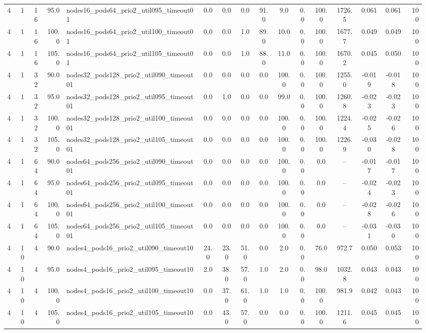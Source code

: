 \begin{tabular}{r r r r l c c c c c c c c c c r}
4 & 1 & 16 & 95.0 & nodes16\_pods64\_prio2\_util095\_timeout01 & 0.0 & 0.0 & 0.0 & 91.0 & 9.0 & 0.0 & 100.0 & 1726.5 & 0.061 & 0.061 & 100 \\
4 & 1 & 16 & 100.0 & nodes16\_pods64\_prio2\_util100\_timeout01 & 0.0 & 0.0 & 1.0 & 89.0 & 10.0 & 0.0 & 100.0 & 1677.7 & 0.049 & 0.049 & 100 \\
4 & 1 & 16 & 105.0 & nodes16\_pods64\_prio2\_util105\_timeout01 & 0.0 & 0.0 & 1.0 & 88.0 & 11.0 & 0.0 & 100.0 & 1670.2 & 0.045 & 0.050 & 100 \\
4 & 1 & 32 & 90.0 & nodes32\_pods128\_prio2\_util090\_timeout01 & 0.0 & 0.0 & 0.0 & 0.0 & 100.0 & 0.0 & 100.0 & 1255.0 & -0.019 & -0.018 & 100 \\
4 & 1 & 32 & 95.0 & nodes32\_pods128\_prio2\_util095\_timeout01 & 0.0 & 1.0 & 0.0 & 0.0 & 99.0 & 0.0 & 100.0 & 1260.8 & -0.023 & -0.023 & 100 \\
4 & 1 & 32 & 100.0 & nodes32\_pods128\_prio2\_util100\_timeout01 & 0.0 & 0.0 & 0.0 & 0.0 & 100.0 & 0.0 & 100.0 & 1224.4 & -0.025 & -0.026 & 100 \\
4 & 1 & 32 & 105.0 & nodes32\_pods128\_prio2\_util105\_timeout01 & 0.0 & 0.0 & 0.0 & 0.0 & 100.0 & 0.0 & 100.0 & 1226.9 & -0.030 & -0.028 & 100 \\
4 & 1 & 64 & 90.0 & nodes64\_pods256\_prio2\_util090\_timeout01 & 0.0 & 0.0 & 0.0 & 0.0 & 100.0 & 0.0 & 0.0 & -- & -0.017 & -0.017 & 100 \\
4 & 1 & 64 & 95.0 & nodes64\_pods256\_prio2\_util095\_timeout01 & 0.0 & 0.0 & 0.0 & 0.0 & 100.0 & 0.0 & 0.0 & -- & -0.024 & -0.023 & 100 \\
4 & 1 & 64 & 100.0 & nodes64\_pods256\_prio2\_util100\_timeout01 & 0.0 & 0.0 & 0.0 & 0.0 & 100.0 & 0.0 & 0.0 & -- & -0.028 & -0.026 & 100 \\
4 & 1 & 64 & 105.0 & nodes64\_pods256\_prio2\_util105\_timeout01 & 0.0 & 0.0 & 0.0 & 0.0 & 100.0 & 0.0 & 0.0 & -- & -0.031 & -0.030 & 100 \\
4 & 10 & 4 & 90.0 & nodes4\_pods16\_prio2\_util090\_timeout10 & 24.0 & 23.0 & 51.0 & 0.0 & 2.0 & 0.0 & 76.0 & 972.7 & 0.050 & 0.053 & 100 \\
4 & 10 & 4 & 95.0 & nodes4\_pods16\_prio2\_util095\_timeout10 & 2.0 & 38.0 & 57.0 & 1.0 & 2.0 & 0.0 & 98.0 & 1032.8 & 0.043 & 0.043 & 100 \\
4 & 10 & 4 & 100.0 & nodes4\_pods16\_prio2\_util100\_timeout10 & 0.0 & 37.0 & 61.0 & 1.0 & 1.0 & 0.0 & 100.0 & 981.9 & 0.042 & 0.043 & 100 \\
4 & 10 & 4 & 105.0 & nodes4\_pods16\_prio2\_util105\_timeout10 & 0.0 & 43.0 & 57.0 & 0.0 & 0.0 & 0.0 & 100.0 & 1211.6 & 0.045 & 0.045 & 100 \\

\end{tabular}
